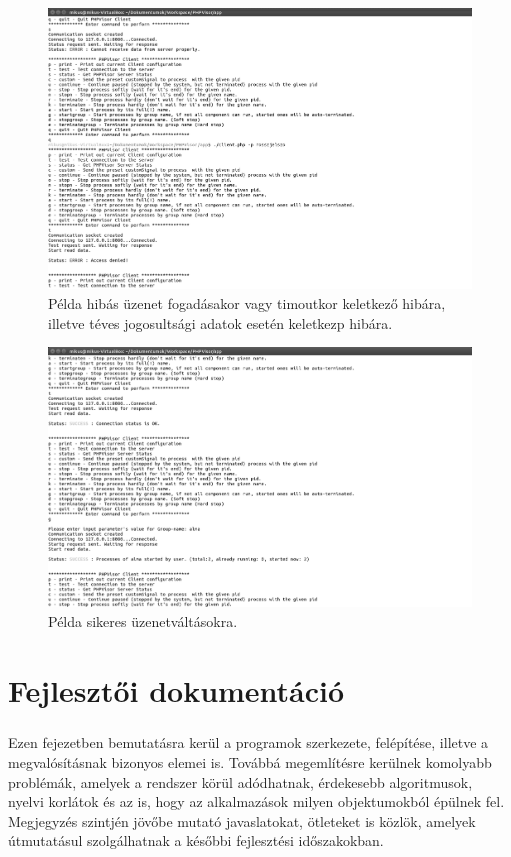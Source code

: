 \documentclass[12pt]{report}
\begin{document}
     \begin{figure}[ht]
  \centering
    \includegraphics[width=15cm]{pics/err.png}
	  \caption{Példa hibás üzenet fogadásakor vagy timoutkor keletkező hibára, illetve téves jogosultsági adatok esetén keletkezp hibára. }
      \label{fig:err}
  \end{figure}
  
     \begin{figure}[ht]
  \centering
    \includegraphics[width=15cm]{pics/succ.png}
	  \caption{Példa sikeres üzenetváltásokra.}
      \label{fig:succ}
  \end{figure}
  \pagebreak
\chapter{Fejlesztői dokumentáció}
\paragraph{}
Ezen fejezetben bemutatásra kerül a programok szerkezete, felépítése, illetve a megvalósításnak bizonyos elemei is. Továbbá megemlítésre kerülnek komolyabb problémák, amelyek a rendszer körül adódhatnak, érdekesebb algoritmusok, nyelvi korlátok és az is, hogy az alkalmazások milyen objektumokból épülnek fel. Megjegyzés szintjén jövőbe mutató javaslatokat, ötleteket is közlök, amelyek útmutatásul szolgálhatnak a későbbi fejlesztési időszakokban.
\end{document}
